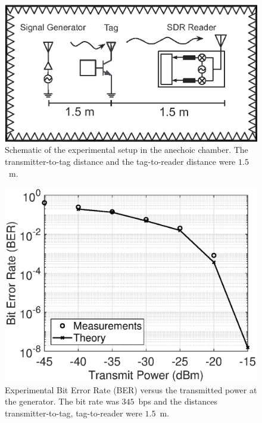 \documentclass[journal]{IEEEtran}
\begin{document}
\begin{figure}[t]
\centering
\includegraphics[width=0.8\columnwidth]{Figures/Fig12.eps}
\caption{Schematic of the experimental setup in the anechoic chamber.  The transmitter-to-tag  distance and the tag-to-reader distance were $1.5$~m.}
\label{fig:chamber}
\end{figure}
%
\begin{figure}[t]
\centering
\includegraphics[width=0.8\columnwidth]{Figures/Fig13.eps}
\caption{Experimental Bit Error Rate (BER) versus the transmitted power at the generator. The bit rate was  $345$~bps and the distances transmitter-to-tag, tag-to-reader   were $1.5$~m.}
\label{fig:BER}
\end{figure}
\end{document}
